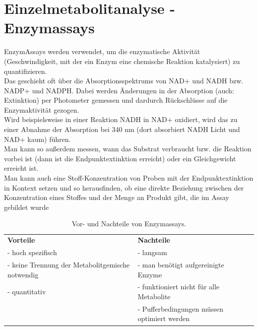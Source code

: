 \section{Einzelmetabolitanalyse - Enzymassays}
Enzym\glspl{Assay} werden verwendet, um die enzymatische Aktivität (Geschwindigkeit, mit der ein Enzym eine chemische Reaktion katalysiert) zu quantifizieren.  \\
Das geschieht oft über die \glspl{Absorptionsspektrum} von NAD+ und NADH bzw. NADP+ und NADPH. Dabei werden Änderungen in der Absorption (auch: \gls{Extinktion}) per Photometer gemessen und dardurch Rückschlüsse auf die Enzymaktivität gezogen. \\
Wird beispielsweise in einer Reaktion NADH in NAD+ oxidiert, wird das zu einer Abnahme der Absorption bei 340 nm (dort absorbiert NADH Licht und NAD+ kaum) führen. \\ \newline
Man kann so außerdem messen, wann das \gls{Substrat} verbraucht bzw. die Reaktion vorbei ist (dann ist die \gls{Endpunktextinktion} erreicht) oder ein Gleichgewicht erreicht ist.  \\
Man kann auch eine Stoff-Konzentration von Proben mit der Endpunktextinktion in Kontext setzen und so herausfinden, ob eine direkte Beziehung zwischen der Konzentration eines Stoffes und der Menge an Produkt gibt, die im \Gls{Assay} gebildet wurde

\begin{table}[H]
    \centering
    \begin{tabular}{p{8cm} p{8cm}}
        \textbf{Vorteile} & \textbf{Nachteile} \\
       - hoch spezifisch  & - langsam \\
       - keine Trennung der Metabolitgemische notwendig & - man benötigt aufgereinigte Enzyme \\
      - quantitativ & - funktioniert nicht für alle Metabolite \\
        & - Pufferbedingungen müssen optimiert werden
    \end{tabular}
    \caption{Vor- und Nachteile von Enzymassays.}
    \label{tab:prokontraenzymassays}
\end{table}

